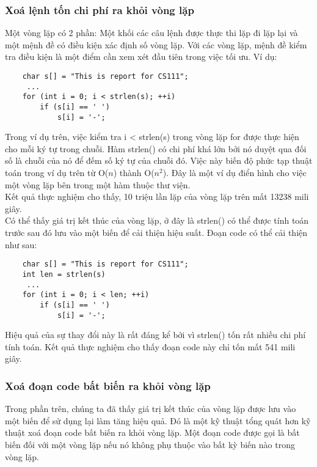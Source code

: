 \documentclass{article}
\begin{document}
\subsubsection{Xoá lệnh tốn chi phí ra khỏi vòng lặp}
Một vòng lặp có 2 phần: Một khối các câu lệnh được thực thi lặp đi lặp lại và một mệnh đề có điều kiện xác định số vòng lặp. Với các vòng lặp, mệnh đề kiểm tra điều kiện là một điểm cần xem xét đầu tiên trong việc tối ưu. Ví dụ:\\

\begin{verbatim}
    char s[] = "This is report for CS111";
     ...
    for (int i = 0; i < strlen(s); ++i)
        if (s[i] == ' ')
            s[i] = '-';
\end{verbatim}

Trong ví dụ trên, việc kiểm tra i < strlen(s) trong vòng lặp for được thực hiện cho mỗi ký tự trong chuỗi. Hàm strlen() có chi phí khá lớn bởi nó duyệt qua đối số là chuỗi của nó để đếm số ký tự của chuỗi đó. Việc này biến độ phức tạp thuật toán trong ví dụ trên từ O($n$) thành O($n^2$). Đây là một ví dụ điển hình cho việc một vòng lặp bên trong một hàm thuộc thư viện.\\

Kết quả thực nghiệm cho thấy, 10 triệu lần lặp của vòng lặp trên mất 13238 mili giây.\\

Có thể thấy giá trị kết thúc của vòng lặp, ở đây là strlen() có thể được tính toán trước sau đó lưu vào một biến để cải thiện hiệu suất. Đoạn code có thể cải thiện như sau:\\

\begin{verbatim}
    char s[] = "This is report for CS111";
    int len = strlen(s)
     ...
    for (int i = 0; i < len; ++i)
        if (s[i] == ' ')
            s[i] = '-';
\end{verbatim}

Hiệu quả của sự thay đổi này là rất đáng kể bởi vì strlen() tốn rất nhiều chi phí tính toán. Kết quả thực nghiệm cho thấy đoạn code này chỉ tốn mất 541 mili giây.

\subsubsection{Xoá đoạn code bất biến ra khỏi vòng lặp}
Trong phần trên, chúng ta đã thấy giá trị kết thúc của vòng lặp được lưu vào một biến để sử dụng lại làm tăng hiệu quả. Đó là một kỹ thuật tổng quát hơn kỹ thuật xoá đoạn code bất biến ra khỏi vòng lặp. Một đoạn code được gọi là bất biến đối với một vòng lặp nếu nó không phụ thuộc vào bất kỳ biến nào trong vòng lặp.\\
\end{document}
